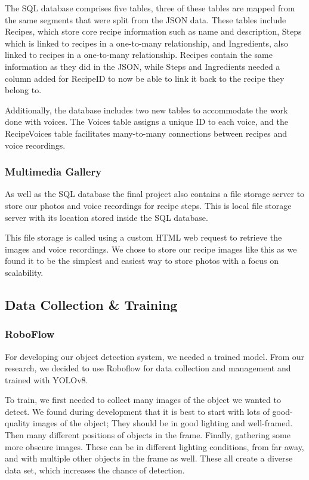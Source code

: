 \documentclass{article}
\begin{document}
The SQL database comprises five tables, three of these tables are mapped from
the same segments that were split from the JSON data. These tables include
Recipes, which store core recipe information such as name and description,
Steps which is linked to recipes in a one-to-many relationship, and
Ingredients, also linked to recipes in a one-to-many relationship. Recipes
contain the same information as they did in the JSON, while Steps and
Ingredients needed a column added for RecipeID to now be able to link it back
to the recipe they belong to.

Additionally, the database includes two new tables to accommodate the work done
with voices. The Voices table assigns a unique ID to each voice, and the
Recipe\textunderscore Voices table facilitates many-to-many connections between
recipes and voice recordings.
\subsubsection{Multimedia Gallery}\label{multimediaGallery}
As well as the SQL database the final project also contains a file storage
server to store our photos and voice recordings for recipe steps. This is local
file storage server with its location stored inside the SQL database.

This file storage is called using a custom HTML web request to retrieve the
images and voice recordings. We chose to store our recipe images like this as
we found it to be the simplest and easiest way to store photos with a focus on
scalability.

\subsection{Data Collection \& Training}
\subsubsection{RoboFlow}
For developing our object detection system, we needed a trained model. From our
research, we decided to use Roboflow for data collection and management and
trained with YOLOv8.

To train, we first needed to collect many images of the object we wanted to
detect. We found during development that it is best to start with lots of
good-quality images of the object; They should be in good lighting and
well-framed. Then many different positions of objects in the frame. Finally,
gathering some more obscure images. These can be in different lighting
conditions, from far away, and with multiple other objects in the frame as
well. These all create a diverse data set, which increases the chance of
detection.
\end{document}
